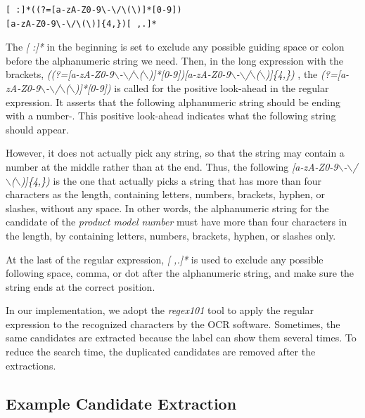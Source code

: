 \documentclass[technicalreport]{ieicej}
\begin{document}
            \begin{center}
            \begin{BVerbatim}
[ :]*((?=[a-zA-Z0-9\-\/\(\)]*[0-9])
[a-zA-Z0-9\-\/\(\)]{4,})[ ,.]*
            \end{BVerbatim}
            \end{center}
    
        The {\em [ :]*} in the beginning is set to exclude any possible guiding space or colon before the alphanumeric string we need. Then, in the long expression with the brackets, {\em ((?=[a-zA-Z0-9$\backslash$-$\backslash$/$\backslash$($\backslash$)]*[0-9])[a-zA-Z0-9$\backslash$-$\backslash$/$\backslash$($\backslash$)]\{4,\}) }, the {\em (?=[a-zA-Z0-9$\backslash$-$\backslash$/$\backslash$($\backslash$)]*[0-9])} is called for the positive look-ahead in the regular expression. It asserts that the following alphanumeric string should be ending with a number\cite{lookahead}-\cite{regex-tutorial}. This positive look-ahead indicates what the following string should appear. 

        However, it does not actually pick any string, so that the string may contain a number at the middle rather than at the end. Thus, the following {\em [a-zA-Z0-9$\backslash$-$\backslash$/$\backslash$($\backslash$)]\{4,\})} is the one that actually picks a string that has more than four characters as the length, containing letters, numbers, brackets, hyphen, or slashes, without any space. In other words, the alphanumeric string for the candidate of the {\em product model number} must have more than four characters in the length, by containing letters, numbers, brackets, hyphen, or slashes only.

        At the last of the regular expression, {\em [ ,.]*} is used to exclude any possible following space, comma, or dot after the alphanumeric string, and make sure the string ends at the correct position.

        In our implementation, we adopt the {\em regex101} tool \cite{regex101} to apply the regular expression to the recognized characters by the OCR software. Sometimes, the same candidates are extracted because the label can show them several times. To reduce the search time, the duplicated candidates are removed after the extractions.


        \subsection{Example Candidate Extraction}
\end{document}
